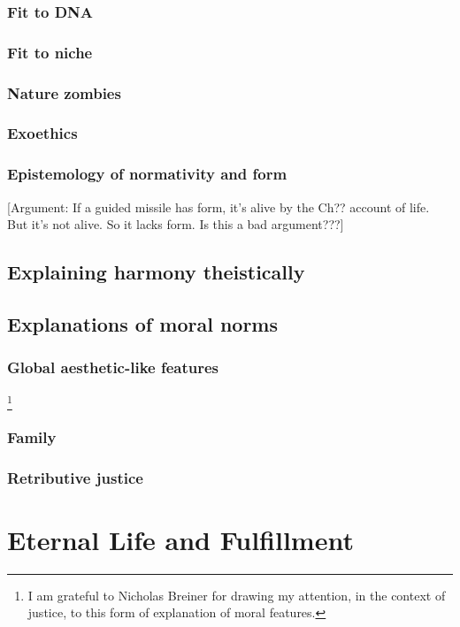 \subsection{Fit to DNA}
\subsection{Fit to niche}
\subsection{Nature zombies}
\subsection{Exoethics}
\subsection{Epistemology of normativity and form}\label{ch:epist-of-form}
[Argument: If a guided missile has form, it's alive by the Ch?? account of life. But it's not alive. So it lacks form. Is this a bad argument???]
\section{Explaining harmony theistically}
\section{Explanations of moral norms}
\subsection{Global aesthetic-like features}\footnote{I am grateful to Nicholas Breiner for drawing my attention, in the context of
justice, to this form of explanation of moral features.}
\subsection{Family}
\subsection{Retributive justice}
\chaptertail

\def\mychapter{XI}

\chapter{Eternal Life and Fulfillment}\label{ch:eternal-life}
\chaptertail

